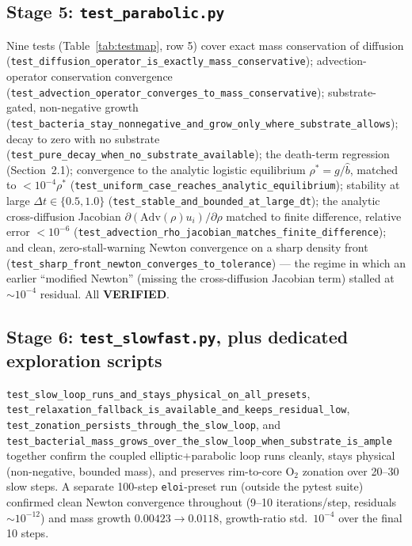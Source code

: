 \documentclass[11pt]{article}
\newcommand{\verified}{\textcolor{green!45!black}{\textbf{VERIFIED}}}
\newcommand{\code}[1]{\texttt{#1}}
\newcommand{\test}[1]{\texttt{\small #1}}
\begin{document}
\subsection{Stage 5: \code{test\_parabolic.py}}
Nine tests (Table~\ref{tab:testmap}, row 5) cover exact mass conservation of
diffusion (\test{test\_diffusion\_operator\_is\_exactly\_mass\_conservative});
advection-operator conservation convergence
(\test{test\_advection\_operator\_converges\_to\_mass\_conservative});
substrate-gated, non-negative growth
(\test{test\_bacteria\_stay\_nonnegative\_and\_grow\_only\_where\_substrate\_allows});
decay to zero with no substrate
(\test{test\_pure\_decay\_when\_no\_substrate\_available}); the death-term
regression (Section~2.1); convergence to the analytic logistic equilibrium
$\rho^\ast=g/\hat b$, matched to $<10^{-4}\rho^\ast$
(\test{test\_uniform\_case\_reaches\_analytic\_equilibrium}); stability at
large $\Delta t\in\{0.5,1.0\}$
(\test{test\_stable\_and\_bounded\_at\_large\_dt}); the analytic
cross-diffusion Jacobian $\partial(\mathrm{Adv}(\rho)u_i)/\partial\rho$
matched to finite difference, relative error $<10^{-6}$
(\test{test\_advection\_rho\_jacobian\_matches\_finite\_difference}); and
clean, zero-stall-warning Newton convergence on a sharp density front
(\test{test\_sharp\_front\_newton\_converges\_to\_tolerance}) --- the regime in
which an earlier ``modified Newton'' (missing the cross-diffusion Jacobian
term) stalled at $\sim10^{-4}$ residual. All \verified{}.

\subsection{Stage 6: \code{test\_slowfast.py}, plus dedicated exploration scripts}
\test{test\_slow\_loop\_runs\_and\_stays\_physical\_on\_all\_presets},
\test{test\_relaxation\_fallback\_is\_available\_and\_keeps\_residual\_low},
\test{test\_zonation\_persists\_through\_the\_slow\_loop}, and
\test{test\_bacterial\_mass\_grows\_over\_the\_slow\_loop\_when\_substrate\_is\_ample}
together confirm the coupled elliptic+parabolic loop runs cleanly, stays
physical (non-negative, bounded mass), and preserves rim-to-core O$_2$
zonation over 20--30 slow steps. A separate 100-step \code{eloi}-preset run
(outside the pytest suite) confirmed clean Newton convergence throughout
(9--10 iterations/step, residuals $\sim 10^{-12}$) and mass growth
$0.00423\to0.0118$, growth-ratio std.\ $10^{-4}$ over the final 10 steps.
\end{document}
